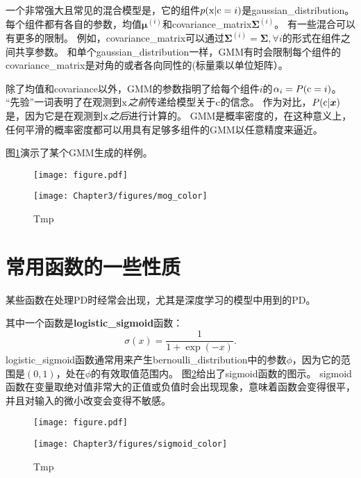 一个非常强大且常见的混合模型是，它的组件$p(\mathrm{x} | \mathrm{c}= i)$是\gls{gaussian_distribution}。
每个组件都有各自的参数，均值$\bm{\mu}^{(i)}$和\gls{covariance_matrix}$\bm{\Sigma}^{(i)}$。
有一些混合可以有更多的限制。
例如，\gls{covariance_matrix}可以通过$\bm{\Sigma}^{(i)} = \bm{\Sigma}, \forall i$的形式在组件之间共享参数。
和单个\gls{gaussian_distribution}一样，\gls{GMM}有时会限制每个组件的\gls{covariance_matrix}是对角的或者各向同性的(标量乘以单位矩阵）。

除了均值和\gls{covariance}以外，\gls{GMM}的参数指明了给每个组件$i$的$\alpha_i = P(\mathrm{c} = i)$。
``先验''一词表明了在观测到$\mathrm{x}$\emph{之前}传递给模型关于$\mathrm{c}$的信念。
作为对比，$P(\mathrm{c} | \bm{x})$是，因为它是在观测到$\mathrm{x}$\emph{之后}进行计算的。
\gls{GMM}是概率密度的，在这种意义上，任何平滑的概率密度都可以用具有足够多组件的\gls{GMM}以任意精度来逼近。

图\ref{fig:chap3_mog_color}演示了某个\gls{GMM}生成的样例。
\begin{figure}[!htb]
\ifOpenSource
\centerline{\texttt{[image: figure.pdf]}}
\else
\centerline{\texttt{[image: Chapter3/figures/mog\_color]}}
\fi
\caption{Tmp}
\label{fig:chap3_mog_color}
\end{figure}


\section{常用函数的一些性质}
\label{sec:useful_properties_of_common_functions}

某些函数在处理\gls{PD}时经常会出现，尤其是深度学习的模型中用到的\gls{PD}。


其中一个函数是\textbf{\gls{logistic_sigmoid}}函数：
\begin{equation}
\sigma(x) = \frac{1}{1+\exp(-x)}.
\end{equation}
\gls{logistic_sigmoid}函数通常用来产生\gls{bernoulli_distribution}中的参数$\phi$，因为它的范围是$(0,1)$，处在$\phi$的有效取值范围内。
图\ref{fig:chap3_sigmoid_color}给出了sigmoid函数的图示。
sigmoid函数在变量取绝对值非常大的正值或负值时会出现现象，意味着函数会变得很平，并且对输入的微小改变会变得不敏感。
\begin{figure}[!htb]
\ifOpenSource
\centerline{\texttt{[image: figure.pdf]}}
\else
\centerline{\texttt{[image: Chapter3/figures/sigmoid\_color]}}
\fi
\caption{Tmp}
\label{fig:chap3_sigmoid_color}
\end{figure}

